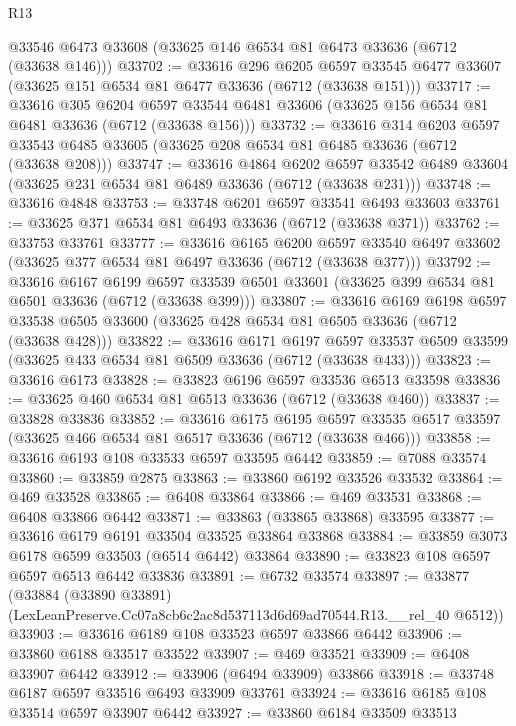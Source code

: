 \begin{lexlean}{R13}
\begin{coremodule}
    @33546
    @6473
    @33608
    (@33625 @146 @6534 @81 @6473 @33636 (@6712 (@33638 @146)))
@33702 := @33616
    @296
    @6205
    @6597
    @33545
    @6477
    @33607
    (@33625 @151 @6534 @81 @6477 @33636 (@6712 (@33638 @151)))
@33717 := @33616
    @305
    @6204
    @6597
    @33544
    @6481
    @33606
    (@33625 @156 @6534 @81 @6481 @33636 (@6712 (@33638 @156)))
@33732 := @33616
    @314
    @6203
    @6597
    @33543
    @6485
    @33605
    (@33625 @208 @6534 @81 @6485 @33636 (@6712 (@33638 @208)))
@33747 := @33616
    @4864
    @6202
    @6597
    @33542
    @6489
    @33604
    (@33625 @231 @6534 @81 @6489 @33636 (@6712 (@33638 @231)))
@33748 := @33616 @4848
@33753 := @33748 @6201 @6597 @33541 @6493 @33603
@33761 := @33625 @371 @6534 @81 @6493 @33636 (@6712 (@33638 @371))
@33762 := @33753 @33761
@33777 := @33616
    @6165
    @6200
    @6597
    @33540
    @6497
    @33602
    (@33625 @377 @6534 @81 @6497 @33636 (@6712 (@33638 @377)))
@33792 := @33616
    @6167
    @6199
    @6597
    @33539
    @6501
    @33601
    (@33625 @399 @6534 @81 @6501 @33636 (@6712 (@33638 @399)))
@33807 := @33616
    @6169
    @6198
    @6597
    @33538
    @6505
    @33600
    (@33625 @428 @6534 @81 @6505 @33636 (@6712 (@33638 @428)))
@33822 := @33616
    @6171
    @6197
    @6597
    @33537
    @6509
    @33599
    (@33625 @433 @6534 @81 @6509 @33636 (@6712 (@33638 @433)))
@33823 := @33616 @6173
@33828 := @33823 @6196 @6597 @33536 @6513 @33598
@33836 := @33625 @460 @6534 @81 @6513 @33636 (@6712 (@33638 @460))
@33837 := @33828 @33836
@33852 := @33616
    @6175
    @6195
    @6597
    @33535
    @6517
    @33597
    (@33625 @466 @6534 @81 @6517 @33636 (@6712 (@33638 @466)))
@33858 := @33616 @6193 @108 @33533 @6597 @33595 @6442
@33859 := @7088 @33574
@33860 := @33859 @2875
@33863 := @33860 @6192 @33526 @33532
@33864 := @469 @33528
@33865 := @6408 @33864
@33866 := @469 @33531
@33868 := @6408 @33866 @6442
@33871 := @33863 (@33865 @33868) @33595
@33877 := @33616 @6179 @6191 @33504 @33525 @33864 @33868
@33884 := @33859 @3073 @6178 @6599 @33503 (@6514 @6442) @33864
@33890 := @33823 @108 @6597 @6597 @6513 @6442 @33836
@33891 := @6732 @33574
@33897 := @33877
    (@33884 (@33890 @33891) (LexLeanPreserve.Cc07a8cb6c2ac8d537113d6d69ad70544.R13.__rel_40 @6512))
@33903 := @33616 @6189 @108 @33523 @6597 @33866 @6442
@33906 := @33860 @6188 @33517 @33522
@33907 := @469 @33521
@33909 := @6408 @33907 @6442
@33912 := @33906 (@6494 @33909) @33866
@33918 := @33748 @6187 @6597 @33516 @6493 @33909 @33761
@33924 := @33616 @6185 @108 @33514 @6597 @33907 @6442
@33927 := @33860 @6184 @33509 @33513

\end{coremodule}
\end{lexlean}
